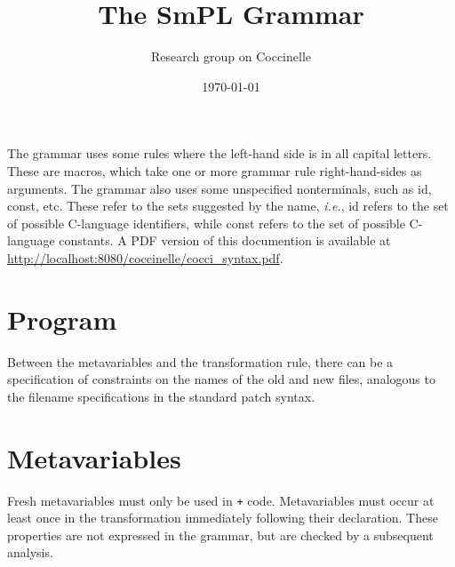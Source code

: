\documentclass{article}
\title{The SmPL Grammar}
\author{Research group on Coccinelle}
\date{\today}
\begin{document}
\maketitle



The grammar uses some rules where the left-hand side is in all capital
letters.  These are macros, which take one or more grammar rule
right-hand-sides as arguments.  The grammar also uses some unspecified
nonterminals, such as {\sf id}, {\sf const}, etc.  These refer to the
sets suggested by the name, {\em i.e.}, {\sf id} refers to the set of
possible C-language identifiers, while {\sf const} refers to the set
of possible C-language constants. \ifhevea A PDF version of this
documention is available at
\url{http://localhost:8080/coccinelle/cocci_syntax.pdf}.  \fi

\section{Program}

\begin{grammar}



\end{grammar}

Between the metavariables and the transformation rule, there can be a
specification of constraints on the names of the old and new files,
analogous to the filename specifications in the standard patch syntax.

\section{Metavariables}

Fresh metavariables must only be used in {\tt +} code.  Metavariables must
occur at least once in the transformation immediately following their
declaration.  These properties are not expressed in the grammar, but are
checked by a subsequent analysis.
\end{document}
